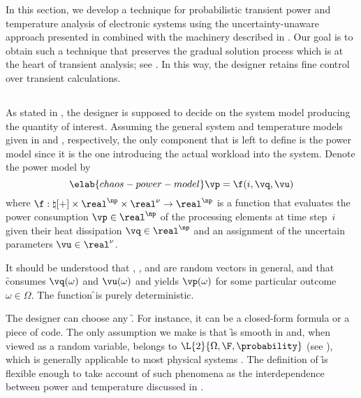 In this section, we develop a technique for probabilistic transient power and
temperature analysis of electronic systems using the uncertainty-unaware
approach presented in  combined with the machinery
described in . Our goal is to obtain such a
technique that preserves the gradual solution process which is at the heart of
transient analysis; see . In this way, the designer
retains fine control over transient calculations.

\subsection{\problemtitle}

As stated in , the designer is supposed to
decide on the system model producing the quantity of interest. Assuming the
general system and temperature models given in  and
, respectively, the only component that is left to
define is the power model since it is the one introducing the actual workload
into the system. Denote the power model by
\begin{equation} \elab{chaos-power-model}
  \vp = \f(i, \vq, \vu)
\end{equation}
where $\f: \natural[+] \times \real^\np \times \real^\nu \to \real^\np$ is a
function that evaluates the power consumption $\vp \in \real^\np$ of the
processing elements at time step~$i$ given their heat dissipation $\vq \in
\real^\np$ and an assignment of the uncertain parameters $\vu \in \real^\nu$.

\begin{remark}
It should be understood that \vp, \vq, and \vu are random vectors in general,
and that \f consumes $\vq(\omega)$ and $\vu(\omega)$ and yields $\vp(\omega)$
for some particular outcome $\omega \in \Omega$. The function \f \perse is
purely deterministic.
\end{remark}

The designer can choose any \f. For instance, it can be a closed-form formula or
a piece of code. The only assumption we make is that \f is smooth in \vz and,
when viewed as a random variable, belongs to $\L{2}{\Omega, \F, \probability}$
(see ), which is generally applicable to most physical
systems \cite{xiu2010}. The definition of \f is flexible enough to take account
of such phenomena as the interdependence between power and temperature discussed
in .

